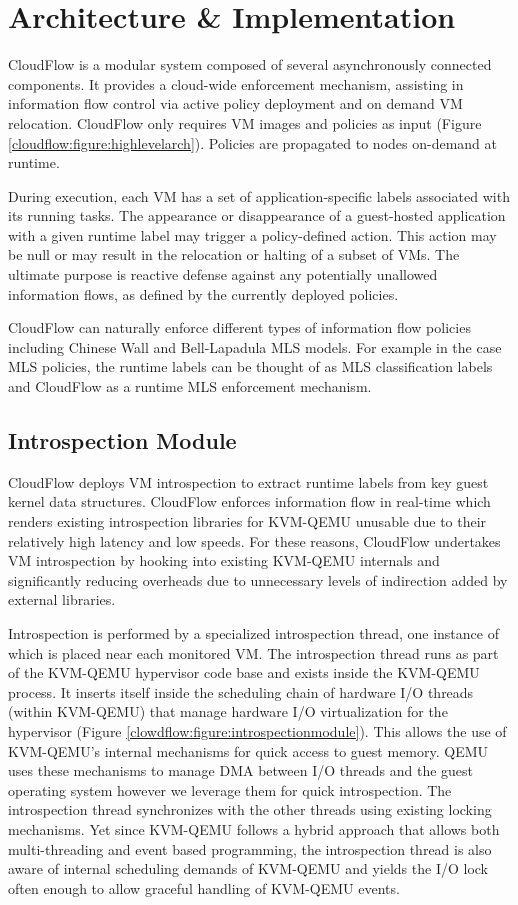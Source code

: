 \section{Architecture \& Implementation}
\label{sec:architecture}

CloudFlow is a modular system composed of several asynchronously connected
components.  It provides a cloud-wide enforcement mechanism, assisting in
information flow control via active policy deployment and on demand VM
relocation.  CloudFlow only requires VM images and policies as input (Figure
\ref{cloudflow:figure:highlevelarch}).  Policies are propagated to nodes
on-demand at runtime. 
 
During execution, each VM has a set of application-specific labels
associated with its running tasks.  The appearance or disappearance of a
guest-hosted application with a given runtime label may trigger a
policy-defined action.  This action may be null or may result in the
relocation or halting of a subset of VMs.  The ultimate purpose is reactive
defense against any potentially unallowed information flows, as defined by the currently deployed policies.  

CloudFlow can naturally enforce different types of information flow policies
including Chinese Wall and Bell-Lapadula MLS models.  For example in the
case MLS policies, the runtime labels can be thought of as MLS
classification labels and CloudFlow as a runtime MLS enforcement mechanism.
\vspace{5pt}
\subsection{Introspection Module}
% 
CloudFlow deploys VM introspection to extract runtime labels
from key guest kernel data structures.  CloudFlow enforces information flow
in real-time which renders existing introspection libraries for KVM-QEMU
unusable due to their relatively high latency and low speeds.  For these reasons,
CloudFlow undertakes VM introspection by hooking into existing KVM-QEMU
internals and significantly reducing overheads due to unnecessary levels of
indirection added by external libraries.

Introspection is performed by a specialized introspection thread, one instance of which is placed near each monitored VM. 
The introspection thread runs as part of the KVM-QEMU hypervisor code base
\cite{QEMU} and exists inside the KVM-QEMU process.  It inserts itself inside the scheduling chain of hardware I/O threads
(within KVM-QEMU) that manage hardware I/O virtualization for the hypervisor
(Figure \ref{clowdflow:figure:introspectionmodule}).  This allows the use of
KVM-QEMU's internal mechanisms for quick access to guest memory. QEMU uses these mechanisms to manage DMA between I/O threads and the guest operating system however we leverage them for quick introspection. The
introspection thread synchronizes with the other threads using existing
locking mechanisms.  Yet since KVM-QEMU follows a hybrid approach that allows
both multi-threading and event based programming, the introspection
thread is also aware of internal scheduling demands of KVM-QEMU and yields
the I/O lock often enough to allow graceful handling of KVM-QEMU events.

